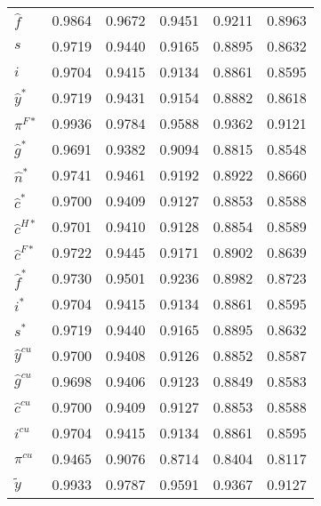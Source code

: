 \begin{center}
\begin{longtable}{lccccc}
${\hat f}              $	 & 	    0.9864	 & 	    0.9672	 & 	    0.9451	 & 	    0.9211	 & 	    0.8963 \\ 
${s}                   $	 & 	    0.9719	 & 	    0.9440	 & 	    0.9165	 & 	    0.8895	 & 	    0.8632 \\ 
${i}                   $	 & 	    0.9704	 & 	    0.9415	 & 	    0.9134	 & 	    0.8861	 & 	    0.8595 \\ 
${\hat y^*}            $	 & 	    0.9719	 & 	    0.9431	 & 	    0.9154	 & 	    0.8882	 & 	    0.8618 \\ 
${\pi^{F*}}            $	 & 	    0.9936	 & 	    0.9784	 & 	    0.9588	 & 	    0.9362	 & 	    0.9121 \\ 
${\hat g^*}            $	 & 	    0.9691	 & 	    0.9382	 & 	    0.9094	 & 	    0.8815	 & 	    0.8548 \\ 
${\hat n^*}            $	 & 	    0.9741	 & 	    0.9461	 & 	    0.9192	 & 	    0.8922	 & 	    0.8660 \\ 
${\hat c^*}            $	 & 	    0.9700	 & 	    0.9409	 & 	    0.9127	 & 	    0.8853	 & 	    0.8588 \\ 
${\hat c^{H*}}         $	 & 	    0.9701	 & 	    0.9410	 & 	    0.9128	 & 	    0.8854	 & 	    0.8589 \\ 
${\hat c^{F*}}         $	 & 	    0.9722	 & 	    0.9445	 & 	    0.9171	 & 	    0.8902	 & 	    0.8639 \\ 
${\hat f^*}            $	 & 	    0.9730	 & 	    0.9501	 & 	    0.9236	 & 	    0.8982	 & 	    0.8723 \\ 
${i^*}                 $	 & 	    0.9704	 & 	    0.9415	 & 	    0.9134	 & 	    0.8861	 & 	    0.8595 \\ 
${s^*}                 $	 & 	    0.9719	 & 	    0.9440	 & 	    0.9165	 & 	    0.8895	 & 	    0.8632 \\ 
${\hat y^{cu}}         $	 & 	    0.9700	 & 	    0.9408	 & 	    0.9126	 & 	    0.8852	 & 	    0.8587 \\ 
${\hat g^{cu}}         $	 & 	    0.9698	 & 	    0.9406	 & 	    0.9123	 & 	    0.8849	 & 	    0.8583 \\ 
${\hat c^{cu}}         $	 & 	    0.9700	 & 	    0.9409	 & 	    0.9127	 & 	    0.8853	 & 	    0.8588 \\ 
${i^{cu}}              $	 & 	    0.9704	 & 	    0.9415	 & 	    0.9134	 & 	    0.8861	 & 	    0.8595 \\ 
${\pi^{cu}}            $	 & 	    0.9465	 & 	    0.9076	 & 	    0.8714	 & 	    0.8404	 & 	    0.8117 \\ 
${\tilde y}            $	 & 	    0.9933	 & 	    0.9787	 & 	    0.9591	 & 	    0.9367	 & 	    0.9127 \\ 

\end{longtable}
\end{center}
